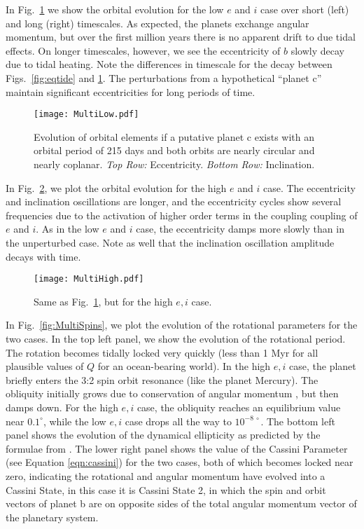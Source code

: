 \documentclass[preprint,12pt]{aastex}
\begin{document}
In Fig.~\ref{fig:MultiLow} we show the orbital evolution for the low
$e$ and $i$ case over short (left) and long (right) timescales. As
expected, the planets exchange angular momentum, but over the first
million years there is no apparent drift to due tidal effects. On
longer timescales, however, we see the eccentricity of $b$ slowly decay
due to tidal heating. Note the differences in timescale for the decay
between Figs.~\ref{fig:eqtide} and \ref{fig:MultiLow}. The
perturbations from a hypothetical ``planet c'' maintain significant
eccentricities for long periods of time.

\begin{figure} 
\begin{center}
\texttt{[image: MultiLow.pdf]}
\end{center}
\caption{Evolution of orbital elements if a putative planet c exists with an 
orbital period of 215 days and both orbits are nearly circular and nearly 
coplanar. {\it Top Row:} Eccentricity. {\it Bottom Row:} Inclination.}
\label{fig:MultiLow}
\end{figure}

In Fig.~\ref{fig:MultiHigh}, we plot the orbital evolution for the
high $e$ and $i$ case. The eccentricity and inclination oscillations
are longer, and the eccentricity cycles show several frequencies due
to the activation of higher order terms in the coupling coupling of $e$ and
$i$. As in the low $e$ and $i$ case, the eccentricity damps more
slowly than in the unperturbed case. Note as well that the inclination
oscillation amplitude decays with time.

\begin{figure} 
\begin{center}
\texttt{[image: MultiHigh.pdf]}
\end{center}
\caption{Same as Fig.~\ref{fig:MultiLow}, but for the high $e,i$ case.}
\label{fig:MultiHigh}
\end{figure}

In Fig.~\ref{fig:MultiSpins}, we plot the evolution of the rotational
parameters for the two cases. In the top left panel, we show the
evolution of the rotational period. The rotation becomes tidally
locked very quickly (less than 1 Myr for all plausible values of $Q$
for an ocean-bearing world). 
In the high $e,i$ case, the planet briefly 
enters the 3:2 spin orbit resonance (like the planet Mercury).
The obliquity initially grows due to
conservation of angular momentum \citep{Correia08}, but then damps
down. For the high $e,i$ case, the obliquity reaches an equilibrium
value near $0.1^\circ$, while the low $e,i$ case drops all the way to
$10^{-8~\circ}$. The bottom left panel shows the evolution of the
dynamical ellipticity as predicted by the formulae from \cite{Atobe2007}.
The lower right panel shows the value of the Cassini Parameter 
(see Equation \ref{eqn:cassini}) for the two cases, both of
which becomes locked near zero, indicating the rotational and angular
momentum have evolved into a Cassini State, in this case it is Cassini
State 2, in which the spin and orbit vectors of planet b are on opposite 
sides of the total angular momentum vector of the planetary system. 
\end{document}

